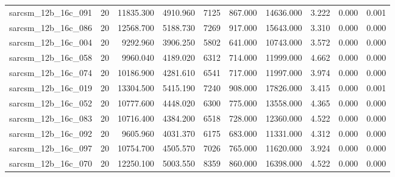 \begin{tabular}{lrrrrrrrrr}
sarcsm\_12b\_16c\_091 & 20 & 11835.300 & 4910.960 & 7125 & 867.000 & 14636.000 & 3.222 & 0.000 & 0.001 \\
sarcsm\_12b\_16c\_086 & 20 & 12568.700 & 5188.730 & 7269 & 917.000 & 15643.000 & 3.310 & 0.000 & 0.000 \\
sarcsm\_12b\_16c\_004 & 20 & 9292.960 & 3906.250 & 5802 & 641.000 & 10743.000 & 3.572 & 0.000 & 0.000 \\
sarcsm\_12b\_16c\_058 & 20 & 9960.040 & 4189.020 & 6312 & 714.000 & 11999.000 & 4.662 & 0.000 & 0.000 \\
sarcsm\_12b\_16c\_074 & 20 & 10186.900 & 4281.610 & 6541 & 717.000 & 11997.000 & 3.974 & 0.000 & 0.000 \\
sarcsm\_12b\_16c\_019 & 20 & 13304.500 & 5415.190 & 7240 & 908.000 & 17826.000 & 3.415 & 0.000 & 0.001 \\
sarcsm\_12b\_16c\_052 & 20 & 10777.600 & 4448.020 & 6300 & 775.000 & 13558.000 & 4.365 & 0.000 & 0.000 \\
sarcsm\_12b\_16c\_083 & 20 & 10716.400 & 4384.200 & 6518 & 728.000 & 12360.000 & 4.522 & 0.000 & 0.000 \\
sarcsm\_12b\_16c\_092 & 20 & 9605.960 & 4031.370 & 6175 & 683.000 & 11331.000 & 4.312 & 0.000 & 0.000 \\
sarcsm\_12b\_16c\_097 & 20 & 10754.700 & 4505.570 & 7026 & 765.000 & 11620.000 & 3.924 & 0.000 & 0.000 \\
sarcsm\_12b\_16c\_070 & 20 & 12250.100 & 5003.550 & 8359 & 860.000 & 16398.000 & 4.522 & 0.000 & 0.000 \\
\bottomrule
\end{tabular}

